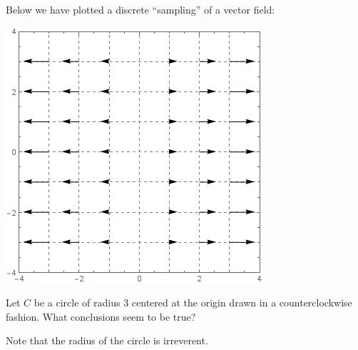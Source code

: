 \documentclass{ximera}
\begin{document}
\begin{exercise}
  Below we have plotted a discrete ``sampling'' of a vector field:
  \begin{image}
    \includegraphics{field5.png}
  \end{image}
  Let $C$ be a circle of radius $3$ centered at the origin drawn in a
  counterclockwise fashion.  What conclusions seem to be true?
  \begin{selectAll}
  \end{selectAll}
  \begin{hint}
    Note that the radius of the circle is irreverent. 
  \end{hint}
\end{exercise}
\end{document}
